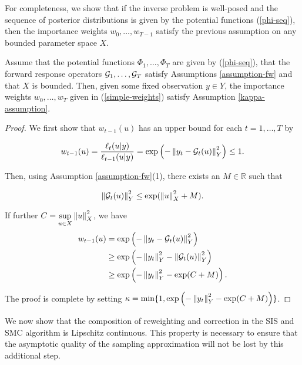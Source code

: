 For completeness, we show that if the inverse problem is well-posed and the sequence of posterior distributions is given by the potential functions (\ref{phi-seq}), then the importance weights $w_0, \ldots, w_{T-1}$ satisfy the previous assumption on any bounded parameter space $X$.

\begin{lemma}\label{easy-lemma}
  Assume that the potential functions $\Phi_1, \ldots, \Phi_T$ are given by (\ref{phi-seq}), that the forward response operators $\mathcal{G}_1, \ldots, \mathcal{G}_T$ satisfy Assumptions \ref{assumption-fw} and that $X$ is bounded. Then, given some fixed observation $y \in Y$, the importance weights $w_0, \ldots, w_T$ given in (\ref{simple-weights}) satisfy Assumption \ref{kappa-assumption}.
\end{lemma}

\begin{proof}
  We first show that $w_{t-1}(u)$ has an upper bound for each $t = 1, \ldots, T$ by

  \begin{equation*}
    w_{t-1}(u)
    = \frac{\ell_t(u|y)}{\ell_{t-1}(u|y)}
    = \exp\left(-\left\lVert y_t - \mathcal{G}_t(u)\right\rVert_Y^2\right) \le 1.
  \end{equation*}

  Then, using Assumption \ref{assumption-fw}(1), there exists an $M \in \mathbb{R}$ such that
  
  \begin{equation*}
    \left\lVert\mathcal{G}_t(u)\right\rVert_Y^2 \le \exp(\left\lVert u\right\rVert_X^2 + M).
  \end{equation*}

  If further $C = \underset{u \in X}{\sup} \left\lVert u\right\rVert_X^2$, we have
  \begin{align*}
    w_{t-1}(u)
    &= \exp\left(-\left\lVert y_t - \mathcal{G}_t(u)\right\rVert_Y^2\right)\\
    &\ge \exp\left(-\left\lVert y_t\right\rVert_Y^2 - \left\lVert\mathcal{G}_t(u)\right\rVert_Y^2\right)\\
    &\ge \exp\left(-\left\lVert y_t\right\rVert_Y^2 - \exp(C+M)\right).
  \end{align*}

  The proof is complete by setting $\kappa = \min\{1, \exp\left(-\left\lVert y_t\right\rVert_Y^2 - \exp(C+M)\right)\}$.
\end{proof}

We now show that the composition of reweighting and correction in the SIS and SMC algorithm is Lipschitz continuous. This property is necessary to ensure that the asymptotic quality of the sampling approximation will not be lost by this additional step.

